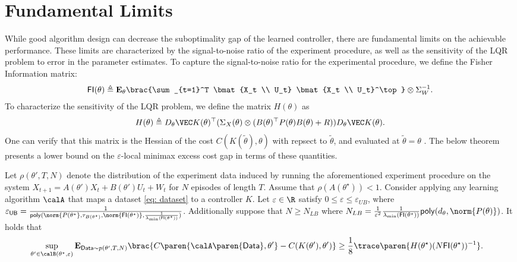\section{Fundamental Limits}
\label{s: lower bound proof}

While good algorithm design can decrease the suboptimality gap of the learned controller, there are fundamental limits on the achievable performance. These limits are characterized by the signal-to-noise ratio of the experiment procedure, as well as the sensitivity of the LQR problem to error in the parameter estimates. To capture the signal-to-noise ratio for the experimental procedure, we define the Fisher Information matrix:
\begin{align}
    \mathsf{FI}(\theta) \triangleq \mathbf{E}_{\theta}\brac{\sum_{t=1}^T \bmat{X_t \\ U_t} \bmat{X_t \\ U_t}^\top } \otimes \Sigma_W^{-1}. \label{eq:FI}
\end{align}
To characterize the sensitivity of the LQR problem, we define the matrix $H(\theta)$ as 
\begin{align}
    \label{eq: model task Hessian}
    H(\theta) \triangleq D_{\theta} \VEC K(\theta)^\top  (\Sigma_X(\theta) \otimes (B(\theta)^\top P(\theta) B(\theta) + R)) D_{\theta} \VEC K(\theta).
\end{align}
One can verify that this matrix is the Hessian of the cost $C(K(\tilde \theta), \theta)$ with repsect to $\tilde \theta$, and evaluated at $\tilde \theta = \theta$ \citep{wagenmaker2021task}. The below theorem presents a lower bound on the  $\varepsilon$-local minimax excess cost gap in terms of these quantities. 
\begin{theorem}
    \label{thm: lower bound}
    Let $\rho(\theta', T, N)$ denote the distribution of the experiment data induced by running the aforementioned experiment procedure on the system $X_{t+1} = A(\theta') X_t + B(\theta') U_t + W_t$ for $N$ episodes of length $T$. Assume that $\rho(A(\theta^\star)) < 1$.   Consider applying any learning algorithm $\calA$ that maps a dataset \eqref{eq: dataset} to a controller $K$. Let $\varepsilon \in \R$ satisfy $0 \leq \varepsilon \leq {\varepsilon_{UB}}$, where $\varepsilon_{\mathsf{UB}} = \frac{1}{\mathsf{poly}(\norm{P(\theta^\star}, \tau_{B(\theta^\star)}, \norm{\mathsf{FI}(\theta^\star)}, \frac{1}{\lambda_{\min}(\mathsf{FI}(\theta^\star))})}$. Additionally suppose that $N \geq N_{LB}$ where $N_{LB} = \frac{1}{\varepsilon^2} \frac{1}{\lambda_{\min}(\mathsf{FI}(\theta^\star))} \mathsf{poly}(d_{\theta}, \norm{P(\theta)})$. It holds that 
    \begin{align*}
        &\sup_{\theta' \in \calB(\theta^\star, \varepsilon)} \mathbf{E}_{\mathsf{Data} \sim p(\theta', T, N)}\brac{C\paren{\calA\paren{\mathsf{Data}}, \theta'} - C(K(\theta'), \theta')} \geq \frac{1}{8} \trace\paren{H(\theta^\star) (N\mathsf{FI}(\theta^\star))^{-1}}.  
    \end{align*}
\end{theorem}
